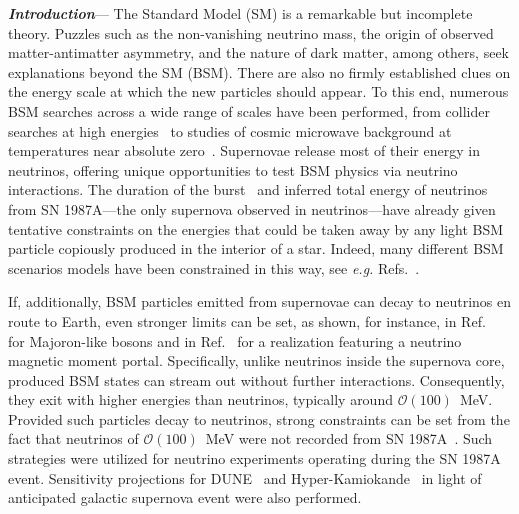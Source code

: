 \documentclass[aps,twocolumn,prl,showpacs,showkeys,preprintnumbers,superscriptaddress,nobibnotes,floatfix,longbibliography,notitlepage,nofootinbib]{revtex4-2}
\begin{document}
\textbf{\textit{Introduction}}---
The Standard Model (SM) is a remarkable but incomplete theory. 
Puzzles such as the non-vanishing neutrino mass, the origin of observed matter-antimatter asymmetry, and the nature of dark matter, among others, seek explanations beyond the SM (BSM).
There are also no firmly established clues on the energy scale at which the new particles should appear.
To this end, numerous BSM searches across a wide range of scales have been performed, from collider searches at high energies~\cite{Nath:2010zj} to studies of cosmic microwave background at temperatures near absolute zero~\cite{Baumann:2015rya}.
Supernovae release most of their energy in neutrinos, offering unique opportunities to test BSM physics via neutrino interactions.
The duration of the burst~\cite{Kamiokande-II:1987idp,Bionta:1987qt,Baksan} and inferred total energy of neutrinos~\cite{Loredo:2001rx,Pagliaroli:2008ur,Huedepohl2010} from SN 1987A---the only supernova observed in neutrinos---have already given tentative constraints on the energies that could be taken away by any light BSM particle copiously produced in the interior of a star.
Indeed, many different BSM scenarios models have been constrained in this way, see \textit{e.g.} Refs.~\cite{Raffelt:2011nc,Arguelles:2016uwb,Suliga:2020vpz,Lucente:2021hbp,Caputo:2022rca,Caputo:2021rux,PhysRevD.100.083002,DeRocco:2019njg,Kazanas:2014mca,Magill:2018jla}.

If, additionally, BSM particles emitted from supernovae can decay to neutrinos en route to Earth, even stronger limits can be set, as shown, for instance, in Ref.~\cite{Fiorillo:2022cdq} for Majoron-like bosons and in Ref.~\cite{Brdar:2023tmi} for a realization featuring a neutrino magnetic moment portal.
Specifically, unlike neutrinos inside the supernova core, produced BSM states can stream out without further interactions.
Consequently, they exit with higher energies than neutrinos, typically around $\mathcal{O}(100)$~MeV.
Provided such particles decay to neutrinos, strong constraints can be set from the fact that neutrinos of $\mathcal{O}(100)$~MeV were not recorded from SN 1987A~\cite{Fiorillo:2022cdq, Brdar:2023tmi}.
Such strategies were utilized for neutrino experiments operating during the SN 1987A event. Sensitivity projections for  DUNE~\cite{DUNE:2015lol} and Hyper-Kamiokande~\cite{Hyper-Kamiokande:2018ofw} in light of anticipated galactic supernova event were also performed. 
\end{document}
